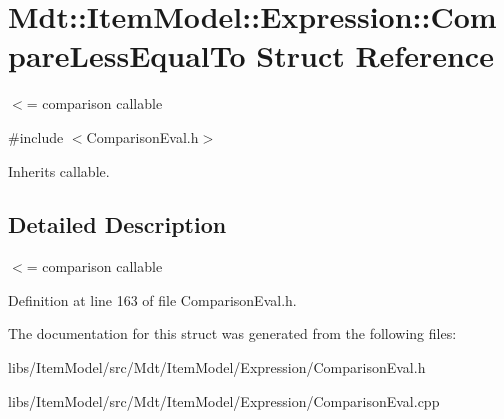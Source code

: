 \hypertarget{struct_mdt_1_1_item_model_1_1_expression_1_1_compare_less_equal_to}{}\section{Mdt\+:\+:Item\+Model\+:\+:Expression\+:\+:Compare\+Less\+Equal\+To Struct Reference}
\label{struct_mdt_1_1_item_model_1_1_expression_1_1_compare_less_equal_to}


$<$= comparison callable  




{\ttfamily \#include $<$Comparison\+Eval.\+h$>$}



Inherits callable.



\subsection{Detailed Description}
$<$= comparison callable 

Definition at line 163 of file Comparison\+Eval.\+h.



The documentation for this struct was generated from the following files\+:\begin{DoxyCompactItemize}
\item 
libs/\+Item\+Model/src/\+Mdt/\+Item\+Model/\+Expression/Comparison\+Eval.\+h\item 
libs/\+Item\+Model/src/\+Mdt/\+Item\+Model/\+Expression/Comparison\+Eval.\+cpp\end{DoxyCompactItemize}
